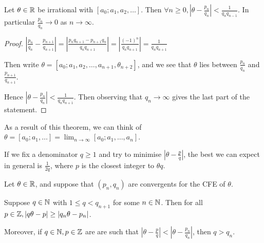 \documentclass[10pt,a4paper]{article}
\begin{document}
\begin{theorem}
Let $\theta \in \mathbb{R}$ be irrational with $[a_0;a_1,a_2,\ldots]$. Then $\forall n \geq 0, |\theta - \frac{p_n}{q_n}| < \frac{1}{q_n q_{n-1}}$. In particular $\frac{p_n}{q_n} \to 0$ as $n \to \infty$.
\end{theorem}
\begin{proof}
$|\frac{p_n}{q_n} - \frac{p_{n+1}}{q_{n+1}}| = |\frac{p_nq_{n+1} - p_{n+1}q_n}{q_nq_{n+1}}| = |\frac{(-1)^n}{q_nq_{n+1}}| = \frac{1}{q_nq_{n+1}}$

Then write $\theta  = [a_0;a_1, a_2, \ldots, a_{n+1}, \theta_{n+2}]$, and we see that $\theta$ lies between $\frac{p_n}{q_n}$ and $\frac{p_{n+1}}{q_{n+1}}$.

Hence $|\theta - \frac{p_n}{q_n}| < \frac{1}{q_nq_{n+1}}$. Then observing that $q_n \to \infty$ gives the last part of the statement.
\end{proof}
As a result of this theorem, we can think of $\theta = [a_0;a_1,\ldots] = \lim_{n\to \infty} [a_0;a_1,\ldots,a_n]$.

If we fix a denominator $q \geq 1$ and try to minimise $|\theta - \frac{p}{q}|$, the best we can expect in general is $\frac{1}{2q}$, where $p$ is the closest integer to $\theta q$.

\begin{theorem}
Let $\theta \in \mathbb{R}$, and suppose that $(p_n, q_n)$ are convergents for the CFE of $\theta$.

Suppose $q \in \mathbb{N}$ with $1 \leq q < q_{n+1}$ for some $n \in \mathbb{N}$. Then for all $p \in \mathbb{Z}, |q \theta - p| \geq |q_n \theta - p_n|$. 

Moreover, if $q \in \mathbb{N}, p\in \mathbb{Z}$ are are such that $|\theta - \frac{p}{q}| < |\theta-\frac{p_n}{q_n}|$, then $q > q_n$.
\end{theorem}
\end{document}
